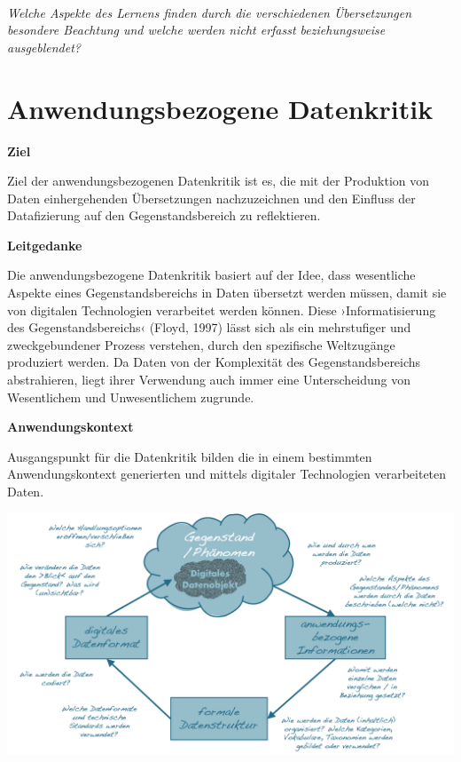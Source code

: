 \documentclass[
  a4paper,
]{book}
\begin{document}
~

\begin{blackbox}
\emph{Welche Aspekte des Lernens finden durch die verschiedenen Übersetzungen besondere Beachtung und welche werden nicht erfasst beziehungsweise ausgeblendet?}

\end{blackbox}

\section{Anwendungsbezogene Datenkritik}\label{anwendungsbezogene-datenkritik}

\textbf{Ziel}

Ziel der anwendungsbezogenen Datenkritik ist es, die mit der Produktion von Daten einhergehenden Übersetzungen nachzuzeichnen und den Einfluss der Datafizierung auf den Gegenstandsbereich zu reflektieren.

\textbf{Leitgedanke}

Die anwendungsbezogene Datenkritik basiert auf der Idee, dass wesentliche Aspekte eines Gegenstandsbereichs in Daten übersetzt werden müssen, damit sie von digitalen Technologien verarbeitet werden können. Diese ›Informatisierung des Gegenstandsbereichs‹ (Floyd, 1997) lässt sich als ein mehrstufiger und zweckgebundener Prozess verstehen, durch den spezifische Weltzugänge produziert werden. Da Daten von der Komplexität des Gegenstandsbereichs abstrahieren, liegt ihrer Verwendung auch immer eine Unterscheidung von Wesentlichem und Unwesentlichem zugrunde.

\textbf{Anwendungskontext}

Ausgangspunkt für die Datenkritik bilden die in einem bestimmten Anwendungskontext generierten und mittels digitaler Technologien verarbeiteten Daten.

\begin{center}\includegraphics{Figures/10-05-anwendungsbezogeneDatenkritik} \end{center}
\end{document}
